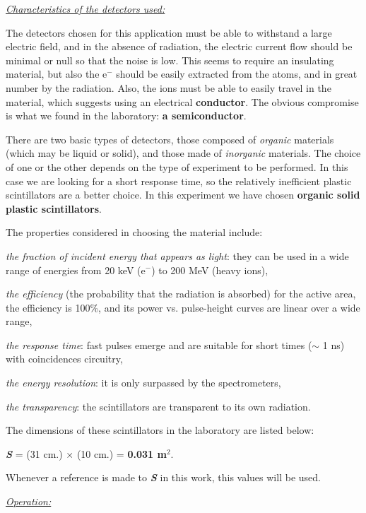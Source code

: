 			\underline{\textit{Characteristics of the detectors used:}}

			The detectors chosen for this application must be able to withstand a large electric field, and in the absence of radiation, the electric current flow should be minimal or null so that the noise is low. This seems to require an insulating material, but also the e$^-$ should be easily extracted from the atoms, and in great number by the radiation. Also, the  ions must be able to easily travel in the material, which suggests using an electrical \textbf{conductor}. The obvious compromise is what we found in the laboratory: \textbf{a semiconductor}.

There are two basic types of detectors, those composed of \textit{organic} materials (which may be liquid or solid), and those made of \textit{inorganic} materials. The choice of one or the other depends on the type of experiment to be performed. In this case we are looking for a short response time, so the relatively inefficient plastic scintillators are a better choice. In this experiment we have chosen \textbf{organic solid plastic scintillators}.

The properties considered in choosing the material include:

		\bi
			\item \textit{the fraction of incident energy that appears as light}: they can be used in a wide range of energies from 20 keV (e$^-$) to 200 MeV (heavy ions),
			\item \textit{the efficiency} (the probability that the radiation is absorbed) for the active area, the efficiency is 100\%, and its power vs. pulse-height curves are linear over a wide range,
			\item \textit{the response time}: fast pulses emerge and are suitable for short times ($\sim$ 1 ns) with coincidences circuitry,
			\item \textit{the energy resolution}: it is only surpassed by the spectrometers,
			\item \textit{the transparency}: the scintillators are transparent to its own radiation.
		\ei

The dimensions of these scintillators in the laboratory are listed below:

		\bc \textit{\textbf{S}} = (31 cm.) $\times$ (10 cm.) = \textbf{0.031 m$^2$}.\ec

Whenever a reference is made to \textit{\textbf{S}} in this work, this values will be used.

			\noindent\underline{\textit{Operation:}}

